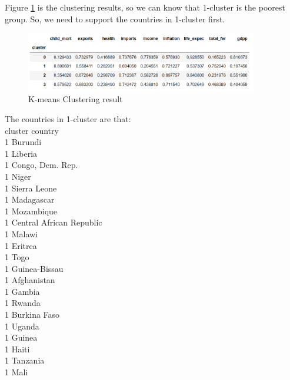 \documentclass[12pt]{article}
\begin{document}
\begin{itemize}
\begin{enumerate}
      Figure \ref{clusters} is the clustering results, so we can know that 1-cluster is the poorest group. So, we need to support the countries in 1-cluster first. 
      \begin{figure}[H]
        \centering
        \includegraphics[width=0.9\textwidth]{figures/clusters.png}
        \caption{K-means Clustering result}\label{clusters}
      \end{figure}

      The countries in 1-cluster are that: \\
      cluster               country\\
      1                     Burundi\\
      1                     Liberia\\
      1            Congo, Dem. Rep.\\
      1                       Niger\\
      1                Sierra Leone\\
      1                  Madagascar\\
      1                  Mozambique\\
      1    Central African Republic\\
      1                      Malawi\\
      1                     Eritrea\\
      1                        Togo\\
      1               Guinea-Bissau\\
      1                 Afghanistan\\
      1                      Gambia\\
      1                      Rwanda\\
      1                Burkina Faso\\
      1                      Uganda\\
      1                      Guinea\\
      1                       Haiti\\
      1                    Tanzania\\
      1                        Mali\\

\end{enumerate}
\end{itemize}
\end{document}

